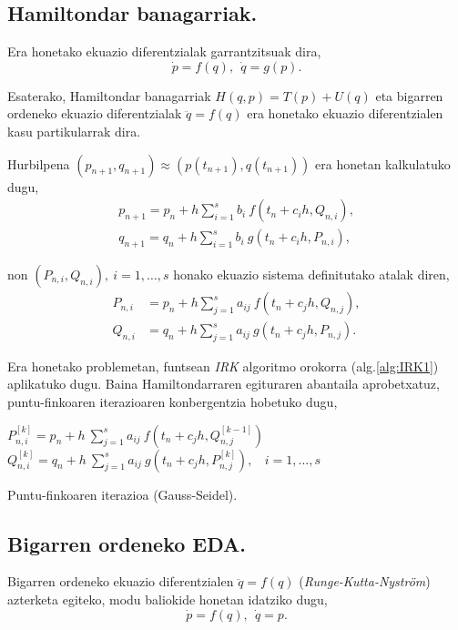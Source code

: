 \subsection*{Hamiltondar banagarriak.}

Era honetako ekuazio diferentzialak garrantzitsuak dira,
\begin{equation*}
\dot{p}=f(q), \ \ \dot{q}=g(p).
\end{equation*}

Esaterako, Hamiltondar banagarriak $H(q,p)=T(p)+U(q)$ eta bigarren ordeneko ekuazio diferentzialak $\ddot{q}=f(q)$ era honetako ekuazio diferentzialen kasu partikularrak dira.

Hurbilpena $(p_{n+1},q_{n+1}) \approx (p(t_{n+1}),q(t_{n+1}))$ era honetan kalkulatuko dugu,
\begin{align*}
p_{n+1}=p_n+ h \sum\limits_{i=1}^{s} b_i \ f(t_n+c_ih,Q_{n,i}),\\
q_{n+1}=q_n+ h \sum\limits_{i=1}^{s} b_i \ g(t_n+c_ih,P_{n,i}),
\end{align*}

non $(P_{n,i},Q_{n,i}), \ i=1,\dots,s$ honako ekuazio sistema definitutako atalak diren, 
\begin{align*}
P_{n,i} &=p_n+ h \sum\limits_{j=1}^{s} a_{ij} \ f(t_n+c_jh,Q_{n,j}), \\
Q_{n,i} &=q_n+ h \sum\limits_{j=1}^{s} a_{ij} \ g(t_n+c_jh,P_{n,j}).
\end{align*}

Era honetako problemetan,  funtsean \emph{IRK} algoritmo orokorra (alg.\ref{alg:IRK1}) aplikatuko dugu. Baina Hamiltondarraren egituraren abantaila aprobetxatuz, puntu-finkoaren iterazioaren konbergentzia hobetuko dugu,   

\begin{algorithm}[H]
  {
   $P_{n,i}^{[k]}=p_{n}+ h \ \sum\limits_{j=1}^{s} a_{ij} \ f(t_n+c_jh,Q_{n,j}^{[k-1]})$\; 
   $Q_{n,i}^{[k]}=q_{n}+ h \ \sum\limits_{j=1}^{s} a_{ij} \ g(t_n+c_jh,P_{n,j}^{[k]}), \ \ \ \ i=1,\dots,s $\; 
  }
 \caption{Puntu-finkoaren iterazioa (Gauss-Seidel).}
\end{algorithm}
 

\subsection*{Bigarren ordeneko EDA.}
 
 
Bigarren ordeneko ekuazio diferentzialen $\ddot{q}=f(q)$ (\emph{Runge-Kutta-Nyström}) azterketa egiteko, modu baliokide honetan idatziko dugu,
\begin{equation*}
\dot{p}=f(q), \ \ \dot{q}=p.
\end{equation*}

